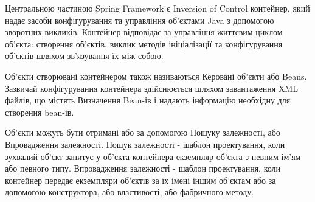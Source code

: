 \par Центральною частиною Spring Framework є Inversion of Control контейнер, який надає засоби конфігурування та управління об'єктами Java з допомогою зворотних викликів. Контейнер відповідає за управління життєвим циклом об'єкта: створення об'єктів, виклик методів ініціалізації та конфігурування об'єктів шляхом зв'язування їх між собою.
\par Об'єкти створювані контейнером також називаються Керовані об'єкти або Beans. Зазвичай конфігурування контейнера здійснюється шляхом завантаження XML файлів, що містять Визначення Bean-ів і надають інформацію необхідну для створення bean-ів.
\par Об'єкти можуть бути отримані або за допомогою Пошуку залежності, або Впровадження залежності. Пошук залежності - шаблон проектування, коли зухвалий об'єкт запитує у об'єкта-контейнера екземпляр об'єкта з певним ім'ям або певного типу. Впровадження залежності - шаблон проектування, коли контейнер передає екземпляри об'єктів за їх імені іншим об'єктам або за допомогою конструктора, або властивості, або фабричного методу.

